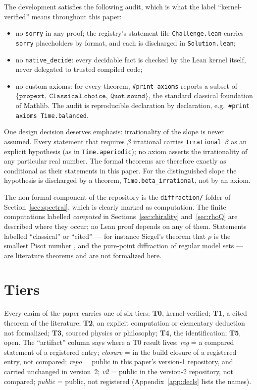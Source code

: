 \documentclass[11pt]{amsart}
\theoremstyle{plain}
\theoremstyle{definition}
\theoremstyle{remark}
\begin{document}
The development satisfies the following audit, which is what the label
``kernel-verified'' means throughout this paper:
\begin{itemize}
\item no \texttt{sorry} in any proof; the registry's statement file
  \texttt{Challenge.lean} carries \texttt{sorry} placeholders by format, and
  each is discharged in \texttt{Solution.lean};
\item no \texttt{native\_decide}: every decidable fact is checked by the Lean
  kernel itself, never delegated to trusted compiled code;
\item no custom axioms: for every theorem, \texttt{\#print axioms} reports a
  subset of $\{\texttt{propext},\ \texttt{Classical.choice},\
  \texttt{Quot.sound}\}$, the standard classical foundation of Mathlib. The
  audit is reproducible declaration by declaration, e.g.\
  \texttt{\#print axioms Time.balanced}.
\end{itemize}

One design decision deserves emphasis: irrationality of the slope is never
assumed. Every statement that requires $\beta$ irrational carries
\texttt{Irrational}~$\beta$ as an explicit hypothesis (as in
\texttt{Time.aperiodic}); no axiom asserts the irrationality of any particular
real number. The formal theorems are therefore exactly as conditional as their
statements in this paper. For the distinguished slope the hypothesis is
discharged by a theorem, \texttt{Time.beta\_irrational}, not by an axiom.

The non-formal component of the repository is the
\texttt{diffraction/} folder of Section~\ref{sec:spectral}, which is clearly
marked as computation. The finite computations labelled \emph{computed} in
Sections~\ref{sec:chirality} and~\ref{sec:rhoQ} are described where they occur;
no Lean proof depends on any of them. Statements
labelled ``classical'' or ``cited'' --- for instance Siegel's theorem that
$\rho$ is the smallest Pisot number \cite{siegel1944}, and the pure-point
diffraction of regular model sets \cite{hof1995, schlottmann2000} --- are
literature theorems and are not formalized here.

\appendix

\section{Tiers}
\label{app:tiers}

Every claim of the paper carries one of six tiers: \textbf{T0}, kernel-verified;
\textbf{T1}, a cited theorem of the literature; \textbf{T2}, an explicit computation
or elementary deduction not formalized; \textbf{T3}, sourced physics or philosophy;
\textbf{T4}, the identification; \textbf{T5}, open. The ``artifact'' column says
where a T0 result lives: \emph{reg} = a compared statement of a registered entry;
\emph{closure} = in the build closure of a registered entry, not compared;
\emph{repo} = public in this paper's version-1 repository, and carried unchanged in
version~2; \emph{v2} = public in the version-2 repository, not compared;
\emph{public} = public, not registered (Appendix~\ref{app:decls} lists the names).
\end{document}
